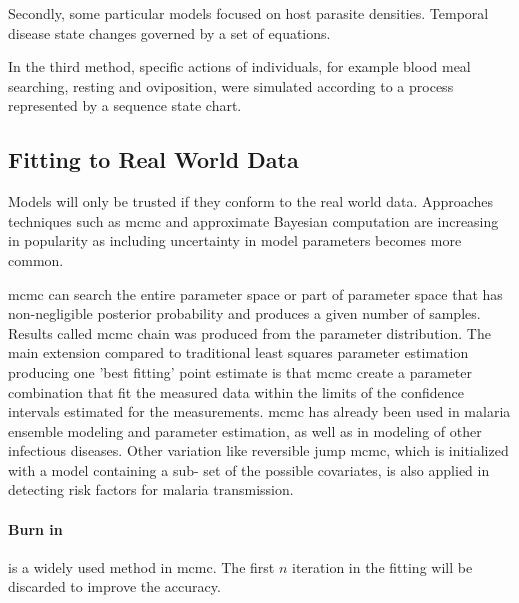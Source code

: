 \documentclass[a4paper, 12pt, twoside]{article}
\begin{document}
Secondly, some particular models focused on host parasite densities.
Temporal disease state changes governed by a set of equations.

In the third method, specific actions of individuals, for example blood meal searching, resting and oviposition, were simulated according to a process represented by a sequence state chart.

\subsection{Fitting to Real World Data}
Models will only be trusted if they conform to the real world data.
Approaches techniques such as \gls{mcmc} \cite{Hastings1970} and approximate Bayesian computation are increasing in popularity as including uncertainty in model parameters becomes more common.

\gls{mcmc} can search the entire parameter space or part of parameter space that has non-negligible posterior probability and produces a given number of samples.
Results called \gls{mcmc} chain was produced from the parameter distribution.
The main extension compared to traditional least squares parameter estimation producing one ’best fitting’ point estimate is that \gls{mcmc} create a parameter combination that fit the measured data within the limits of the confidence intervals estimated for the measurements.
\gls{mcmc} has already been used in malaria ensemble modeling\cite{Cameron2015,Penny2015,Penny2015a} and parameter estimation, as well as in modeling of other infectious diseases.
Other variation like reversible jump \gls{mcmc}, which is initialized with a model containing a sub- set of the possible covariates, is also applied in detecting risk factors for malaria transmission\cite{Millar2018a}.

\paragraph{Burn in}%
\label{par:burn_in}
is a widely used method in \gls{mcmc}. The first $n$ iteration in the fitting will be discarded to improve the accuracy.
\end{document}
